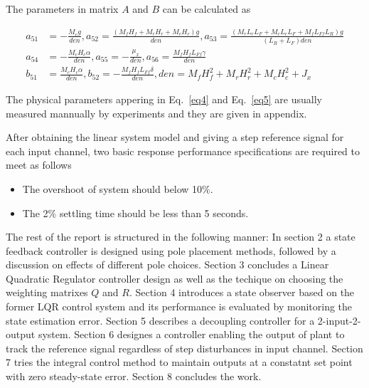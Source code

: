 \documentclass[hyperref]{article}
\theoremstyle{nonumberplain}
\begin{document}
	The parameters in matrix $A$ and $B$ can be calculated as
	
	\begin{equation}
	\begin{split}
			a_{51}&=-\frac{M_{c}g}{den},
			a_{52}=\frac{(M_{f}H_{f}+M_{r}H_{r}+M_{c}H_{c})g}{den}, 
			a_{53}=\frac{(M_{r}L_{r}L_{F}+M_{c}L_{c}L_{F}+M_{f}L_{Ff}L_{R})g}{(L_{R}+L_{F})den}\\
			a_{54}&=-\frac{M_{c}H_{c}\alpha}{den},
			a_{55}=-\frac{\mu _{x}}{den},
			a_{56}=\frac{M_{f}H_{f}L_{Ff}\gamma }{den}\\		
			b_{51}&=\frac{M_{c}H_{c}\alpha }{den},
			b_{52}=-\frac{M_{f}H_{f}L_{Ff}\delta }{den},
			den=M_{f}H_{f}^{2}+M_{r}H_{r}^2+M_{c}H_{c}^{2}+J_{x}
			\label{eq5}			
	\end{split}
	\end{equation}
	
	The physical parameters appering in Eq.~\ref{eq4} and Eq.~\ref{eq5} are usually measured mannually by experiments and they are given in appendix.
	
	After obtaining the linear system model and giving a step reference signal for each input channel, two basic response performance specifications are required to meet as follows
	
	\begin{itemize}
		\item The overshoot of system should below 10\%.
		\item The 2\% settling time should be less than 5 seconds.
	\end{itemize}

	The rest of the report is structured in the following manner: In section 2 a state feedback controller is designed using pole placement methods, followed by a discussion on effects of different pole choices. Section 3 concludes a Linear Quadratic Regulator controller design as well as the techique on choosing the weighting matrixes $Q$ and $R$. Section 4 introduces a state observer based on the former LQR control system and its performance is evaluated by monitoring the state estimation error. Section 5 describes a decoupling controller for a 2-input-2-output system. Section 6 designes a controller enabling the output of plant to track the reference signal regardless of step disturbances in input channel. Section 7 tries the integral control method to maintain outputs at a constatnt set point with zero steady-state error. Section 8 concludes the work.
	
\end{document}
